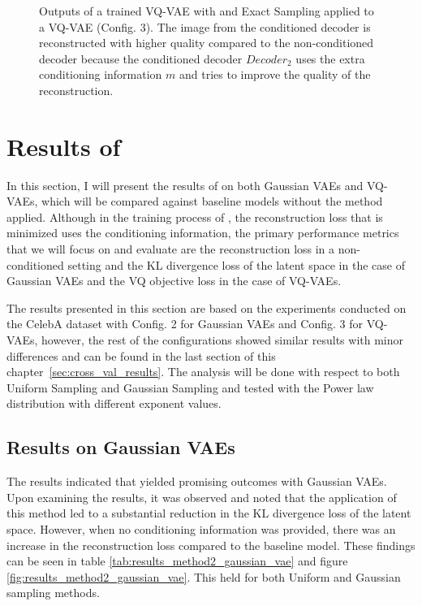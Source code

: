 \begin{figure}[H]
    \centering
    
    \caption[Trained neural network with  applied to a VQ-VAE.]
    {
        Outputs of a trained VQ-VAE with  and Exact Sampling applied to a VQ-VAE (Config. 3). The image from the conditioned decoder is reconstructed with higher quality compared to the non-conditioned decoder because the conditioned decoder $Decoder_2$ uses the extra conditioning information $m$ and tries to improve the quality of the reconstruction.
    }
    \label{fig:rec_vqvae}
\end{figure}


\section{Results of }

In this section, I will present the results of  on both Gaussian VAEs and VQ-VAEs, which will be compared against baseline models without the method applied. Although in the training process of , the reconstruction loss that is minimized uses the conditioning information, the primary performance metrics that we will focus on and evaluate are the reconstruction loss in a non-conditioned setting and the KL divergence loss of the latent space in the case of Gaussian VAEs and the VQ objective loss in the case of VQ-VAEs.

The results presented in this section are based on the experiments conducted on the CelebA dataset with Config. 2 for Gaussian VAEs and Config. 3 for VQ-VAEs, however, the rest of the configurations showed similar results with minor differences and can be found in the last section of this chapter~\ref{sec:cross_val_results}. The analysis will be done with respect to both Uniform Sampling and Gaussian Sampling and tested with the Power law distribution with different exponent values.


\subsection{Results on Gaussian VAEs}

The results indicated that  yielded promising outcomes with Gaussian VAEs. Upon examining the results, it was observed and noted that the application of this method led to a substantial reduction in the KL divergence loss of the latent space. However, when no conditioning information was provided, there was an increase in the reconstruction loss compared to the baseline model. These findings can be seen in table \ref{tab:results_method2_gaussian_vae} and figure \ref{fig:results_method2_gaussian_vae}. This held for both Uniform and Gaussian sampling methods.

